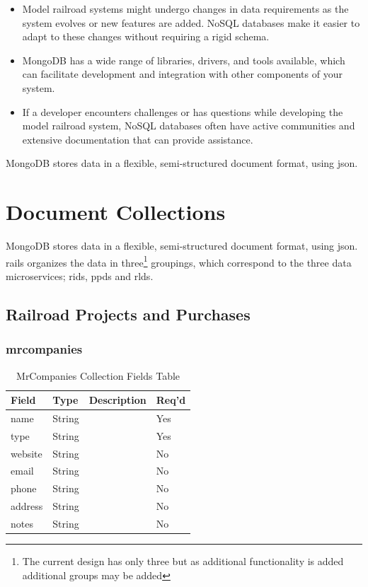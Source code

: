 \begin{itemize}
\item  Model railroad systems might undergo changes in data requirements as the system evolves or new features are added. NoSQL databases make it easier to adapt to these changes without requiring a rigid schema.
\item  MongoDB has a wide range of libraries, drivers, and tools available, which can facilitate development and integration with other components of your system.
\item  If a developer encounters challenges or has questions while developing the model railroad system, NoSQL databases often have active communities and extensive documentation that can provide assistance.
\end{itemize}
MongoDB stores data in a flexible, semi-structured document format, using \gls{json}.
\section{Document Collections}
MongoDB stores data in a flexible, semi-structured document format, using \gls{json}. \gls{rails} organizes the data in three\footnote{The current design has only three but as additional functionality is added additional groups may be added} groupings, which correspond to the three data microservices; \gls{rids}, \gls{ppds} and \gls{rlds}.

\subsection{Railroad Projects and Purchases}
\subsubsection{mrcompanies}
\begin{table}[H]
    \begin{tabular}{|L{3cm}|L{1.7cm}|L{8.8cm}|L{1.3cm}|}
    \hline
        \textbf{Field} & \textbf{Type} & \textbf{Description} & \textbf{Req'd} \\ \hline
	name & String &  & Yes \\ \hline
	type & String &  & Yes \\ \hline
	website & String &  & No \\ \hline
	email & String &  & No \\ \hline
	phone & String &  & No \\ \hline
	address & String &  & No \\ \hline
	notes & String &  & No \\ \hline
    \end{tabular}
    \caption{\label{mrcompany-table}MrCompanies Collection Fields Table}
    \end{table}
